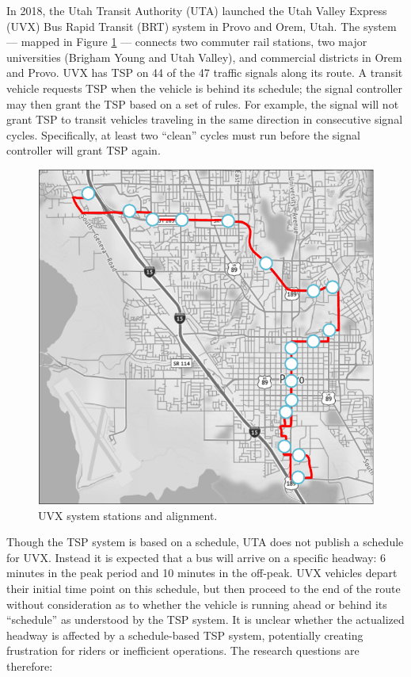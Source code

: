 \documentclass[3p, authoryear, review]{elsarticle} %
\begin{document}
In 2018, the Utah Transit Authority (UTA) launched the Utah Valley Express (UVX)
Bus Rapid Transit (BRT) system in Provo and Orem, Utah. The system --- mapped in Figure \ref{fig:uvxmap} --- connects
two commuter rail stations, two major universities (Brigham Young and Utah Valley),
and commercial districts in Orem and Provo. UVX has TSP on 44 of the 47 traffic
signals along its route. A transit vehicle requests TSP when the vehicle is behind its
schedule; the signal controller may then grant the TSP based on a set of rules.
For example, the signal will not grant TSP to transit vehicles traveling in the
same direction in consecutive signal cycles. Specifically, at least two ``clean'' cycles
must run before the signal controller will grant TSP again.

\begin{figure}
\centering
\includegraphics{uvx_headways_files/figure-latex/uvxmap-1.pdf}
\caption{\label{fig:uvxmap}UVX system stations and alignment.}
\end{figure}

Though the TSP system is based on a schedule, UTA does not publish a schedule
for UVX. Instead it is expected that a bus will arrive on a specific
headway: 6 minutes in the peak period and 10 minutes in the off-peak. UVX vehicles depart
their initial time point on this schedule, but then proceed to the end of the route
without consideration as to whether the vehicle is running ahead or behind its ``schedule''
as understood by the TSP system. It is
unclear whether the actualized headway is affected by a schedule-based TSP
system, potentially creating frustration for riders or inefficient operations.
The research questions are therefore:
\end{document}
